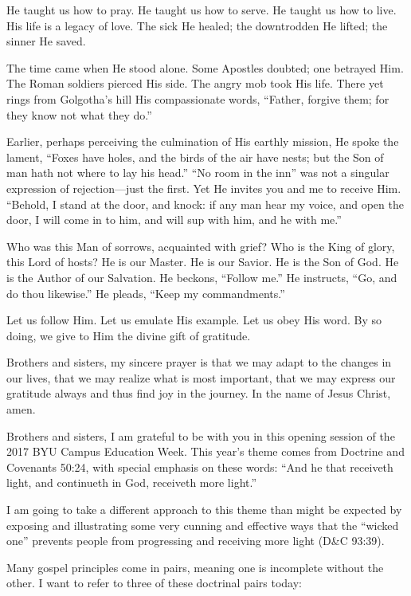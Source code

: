 \documentclass[letterpaper, 11pt]{report}
\newcommand{\speaker}{}
\newcommand{\talk}{}
\newcommand{\setspeaker}[1]{\renewcommand{\speaker}{#1}}
\newcommand{\settalk}[1]{\renewcommand{\talk}{#1}}
\newcommand{\talkheading}[2]{%
    \vspace{1em}
    \noindent{\huge\bfseries #1}
    \par\nopagebreak\vspace{0.25em}
    \noindent{\normalsize\bfseries #2}
    \par\nopagebreak\vspace{0.5em}
}
\begin{document}
He taught us how to pray. He taught us how to serve. He taught us how to live. His life is a legacy of love. The sick He healed; the downtrodden He lifted; the sinner He saved.

The time came when He stood alone. Some Apostles doubted; one betrayed Him. The Roman soldiers pierced His side. The angry mob took His life. There yet rings from Golgotha’s hill His compassionate words, “Father, forgive them; for they know not what they do.”

Earlier, perhaps perceiving the culmination of His earthly mission, He spoke the lament, “Foxes have holes, and the birds of the air have nests; but the Son of man hath not where to lay his head.” “No room in the inn” was not a singular expression of rejection—just the first. Yet He invites you and me to receive Him. “Behold, I stand at the door, and knock: if any man hear my voice, and open the door, I will come in to him, and will sup with him, and he with me.”

Who was this Man of sorrows, acquainted with grief? Who is the King of glory, this Lord of hosts? He is our Master. He is our Savior. He is the Son of God. He is the Author of our Salvation. He beckons, “Follow me.” He instructs, “Go, and do thou likewise.” He pleads, “Keep my commandments.”

Let us follow Him. Let us emulate His example. Let us obey His word. By so doing, we give to Him the divine gift of gratitude.

Brothers and sisters, my sincere prayer is that we may adapt to the changes in our lives, that we may realize what is most important, that we may express our gratitude always and thus find joy in the journey. In the name of Jesus Christ, amen.

\settalk{Be 100 Percent Responsible}
\setspeaker{Lynn G. Robbins}
\talkheading{Be 100 Percent Responsible}{Lynn G. Robbins}

Brothers and sisters, I am grateful to be with you in this opening session of the 2017 BYU Campus Education Week. This year’s theme comes from Doctrine and Covenants 50:24, with special emphasis on these words: “And he that receiveth light, and continueth in God, receiveth more light.”

I am going to take a different approach to this theme than might be expected by exposing and illustrating some very cunning and effective ways that the “wicked one” prevents people from progressing and receiving more light (D\&C 93:39).

Many gospel principles come in pairs, meaning one is incomplete without the other. I want to refer to three of these doctrinal pairs today:
\end{document}
